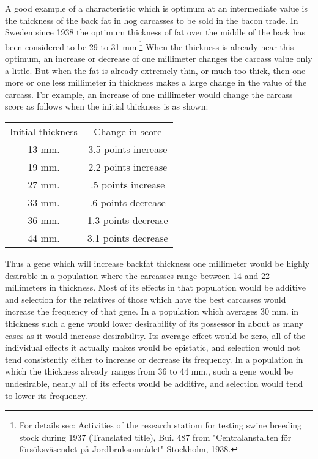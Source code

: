 A good example of a characteristic which is optimum at an intermediate
value is the thickness of the back fat in hog carcasses to be sold
in the bacon trade. In Sweden since 1938 the optimum thickness of fat
over the middle of the back has been considered to be 29 to 31 mm.\footnote{For
details sec: Activities of the research statiom for testing swine breeding
stock during 1937 (Translated title), Bui. 487 from "Centralanstalten f\"or
f\"ors\"oksv\"asendet p{\aa} Jordbruksomr{\aa}det" Stockholm, 1938.}
When the thickness is already near this optimum, an increase or
decrease of one millimeter changes the carcass value only a little. But
when the fat is already extremely thin, or much too thick, then one
more or one less millimeter in thickness makes a large change in the
value of the carcass. For example, an increase of one millimeter would
change the carcass score as follows when the initial thickness is as
shown:

\begin{table}[h]
	\centering
	\begin{tabular}{cc}
	Initial thickness		& Change in score \\
	13 mm.					& 3.5 points increase \\
	19 mm.					& 2.2 points increase \\
	27 mm.					& .5 points increase \\
	33 mm.					& .6 points decrease \\
	36 mm.					& 1.3 points decrease \\
	44 mm.					& 3.1 points decrease \\
	\end{tabular}
\end{table}

\noindent
Thus a gene which will increase backfat thickness one millimeter
would be highly desirable in a population where the carcasses range
between 14 and 22 millimeters in thickness. Most of its effects in that
population would be additive and selection for the relatives of those
which have the best carcasses would increase the frequency of that gene.
In a population which averages 30 mm. in thickness such a gene would
lower desirability of its possessor in about as many cases as it would
increase desirability. Its average effect would be zero, all of the individual
effects it actually makes would be epistatic, and selection would
not tend consistently either to increase or decrease its frequency. In a
population in which the thickness already ranges from 36 to 44 mm.,
such a gene would be undesirable, nearly all of its effects would be additive,
and selection would tend to lower its frequency.

